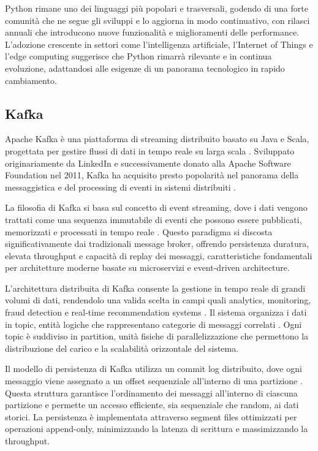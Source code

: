 Python rimane uno dei linguaggi più popolari e trasversali, godendo di una forte comunità che ne segue gli sviluppi e lo aggiorna in modo continuativo, con rilasci annuali che introducono nuove funzionalità e miglioramenti delle performance. L'adozione crescente in settori come l'intelligenza artificiale, l'Internet of Things e l'edge computing suggerisce che Python rimarrà rilevante e in continua evoluzione, adattandosi alle esigenze di un panorama tecnologico in rapido cambiamento.

\subsection{Kafka}

Apache Kafka è una piattaforma di streaming distribuito basato su Java e Scala, progettata per gestire flussi di dati in tempo reale su larga scala \cite{narkhede2017kafka}. Sviluppato originariamente da LinkedIn e successivamente donato alla Apache Software Foundation nel 2011, Kafka ha acquisito presto popolarità nel panorama della messaggistica e del processing di eventi in sistemi distribuiti \cite{garg2013apache}.

La filosofia di Kafka si basa sul concetto di event streaming, dove i dati vengono trattati come una sequenza immutabile di eventi che possono essere pubblicati, memorizzati e processati in tempo reale \cite{stopford2018designing}. Questo paradigma si discosta significativamente dai tradizionali message broker, offrendo persistenza duratura, elevata throughput e capacità di replay dei messaggi, caratteristiche fondamentali per architetture moderne basate su microservizi e event-driven architecture.

L'architettura distribuita di Kafka consente la gestione in tempo reale di grandi volumi di dati, rendendolo una valida scelta in campi quali analytics, monitoring, fraud detection e real-time recommendation systems \cite{kreps2014kafka}. Il sistema organizza i dati in topic, entità logiche che rappresentano categorie di messaggi correlati \cite{narkhede2017kafka}. Ogni topic è suddiviso in partition, unità fisiche di parallelizzazione che permettono la distribuzione del carico e la scalabilità orizzontale del sistema.

Il modello di persistenza di Kafka utilizza un commit log distribuito, dove ogni messaggio viene assegnato a un offset sequenziale all'interno di una partizione \cite{garg2013apache}. Questa struttura garantisce l'ordinamento dei messaggi all'interno di ciascuna partizione e permette un accesso efficiente, sia sequenziale che random, ai dati storici. La persistenza è implementata attraverso segment files ottimizzati per operazioni append-only, minimizzando la latenza di scrittura e massimizzando la throughput.

